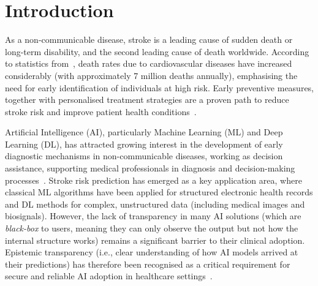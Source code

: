 \section{Introduction} \label{sec:introduction}
As a non-communicable disease, stroke is a leading cause of sudden death or long-term disability, and the second leading cause of death worldwide. According to statistics from~\cite{Feigin2025}, death rates due to cardiovascular diseases have increased considerably (with approximately 7 million deaths annually), emphasising the need for early identification of individuals at high risk. Early preventive measures, together with personalised treatment strategies are a proven path to reduce stroke risk and improve patient health conditions~\cite{dattani2023cardiovascular}.

\medskip 
Artificial Intelligence (AI), particularly Machine Learning (ML) and Deep Learning (DL), has attracted growing interest in the development of early diagnostic mechanisms in non-communicable diseases, working as decision assistance, supporting medical professionals in diagnosis and decision-making processes~\cite{alowais2023revolutionizing, davenport2019potential}. Stroke risk prediction has emerged as a key application area, where classical ML algorithms have been applied for structured electronic health records and DL methods for complex, unstructured data (including medical images and biosignals). However, the lack of transparency in many AI solutions (which are \textit{black-box} to users, meaning they can only observe the output but not how the internal structure works) remains a significant barrier to their clinical adoption. Epistemic transparency (i.e., clear understanding of how AI models arrived at their predictions) has therefore been recognised as a critical requirement for secure and reliable AI adoption in healthcare settings~\cite{winter2023troubling}. 

